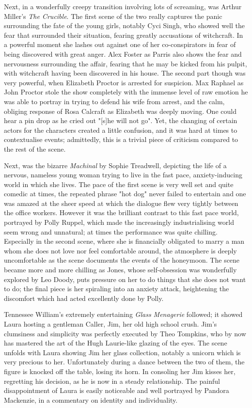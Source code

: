 \documentclass[11pt,a4paper]{report}
\begin{document}
\begin{multicols}{2}
Next, in a wonderfully creepy transition involving lots of screaming,
was Arthur Miller's \textit{The Crucible}. The first scene of the two
really captures the panic surrounding the fate of the young girls,
notably Cyci Singh, who showed well the fear that surrounded their
situation, fearing greatly accusations of witchcraft. In a powerful
moment she lashes out against one of her co-conspirators in fear of
being discovered with great anger. Alex Foster as Parris also shows the
fear and nervousness surrounding the affair, fearing that he may be
kicked from his pulpit, with witchcraft having been discovered in his
house. The second part though was very powerful, when Elizabeth Proctor
is arrested for suspicion. Max Raphael as John Proctor stole the show
completely with the immense level of raw emotion he was able to portray
in trying to defend his wife from arrest, and the calm, obliging
response of Rosa Calcraft as Elizabeth was deeply moving. One could hear
a pin drop as he cried out "{[}s{]}he will not go". Yet, the changing of
certain actors for the characters created a little confusion, and it was
hard at times to contextualise events; admittedly, this is a trivial
piece of criticism compared to the rest of the scene.

Next, was the bizarre \textit{Machinal} by Sophie Treadwell, depicting the
life of a nervous, nameless young woman trying to live in the fast pace,
anxiety-inducing world in which she lives. The pace of the first scene
is very well set and quite comedic at times, the repeated phrase "hot
dog" never failed to entertain and one was amazed at the sheer speed at
which the dialogue flew very tightly between the office workers. However
it was the brilliant contrast to this fast pace world, portrayed by
Polly Ruppel, which made the increasingly industrialising world seem
wrong and unnatural; at times the performance was quite chilling.
Especially in the second scene, where she is financially obligated to
marry a man whom she does not love nor feel comfortable around, the
atmosphere is deeply uncomfortable as the scene documents the events of
the honeymoon. The scene became more and more chilling as Jones, whose
self-obsession was wonderfully explored by Leo Doody, puts pressure on
her to do things that she does not want to do; the final piece is her
spiraling into an anxiety attack, heightening the discomfort which had
acted excellently done by Polly.

Tennessee William's extremely entertaining \textit{Glass Menagerie}
followed; it showed Laura hosting a gentleman Caller, Jim, her old high
school crush. Jim's clumsiness and simplicity was perfectly executed by
Theo Tompkins, who by now has mastered the art of the Hugh Laurie-like
glazing of the eyes. The scene unfolds with Laura showing Jim her glass
collection, notably a unicorn which is very precious to her.
Unfortunately during a dance between the two of them, the figure is
knocked off the table, losing its horn. In consoling her Jim kisses her,
regretting his decision, as he is now in a steady relationship. The
painful disappointment of Laura is easily noticeable and well portrayed
by Pandora Mackenzie, in a commentary on identity and individuality.


\end{multicols}
\end{document}
